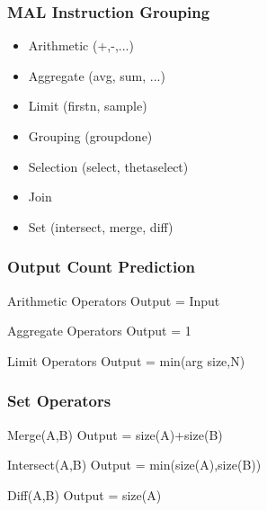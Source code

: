 \begin{frame}[fragile]
\frametitle{MAL Instruction Grouping}
\begin{itemize}
\item Arithmetic (+,-,...)
\item Aggregate (avg, sum, ...)
\item Limit (firstn, sample)
\item Grouping (groupdone)
\item Selection (select, thetaselect)
\item Join
\item Set (intersect, merge, diff)
\end{itemize}
\end{frame}

\begin{frame}
\frametitle{Output Count Prediction}
\begin{block}{Arithmetic Operators}
Output = Input
\end{block}
\begin{block}{Aggregate Operators}
Output = 1
\end{block}
\begin{block}{Limit Operators}
Output = min(arg size,N)
\end{block}
\end{frame}

\begin{frame}
\frametitle{Set Operators}
\begin{block}{Merge(A,B)}
Output = size(A)+size(B)
\end{block}
\begin{block}{Intersect(A,B)}
Output = min(size(A),size(B))
\end{block}
\begin{block}{Diff(A,B)}
Output = size(A)
\end{block}
\end{frame}

